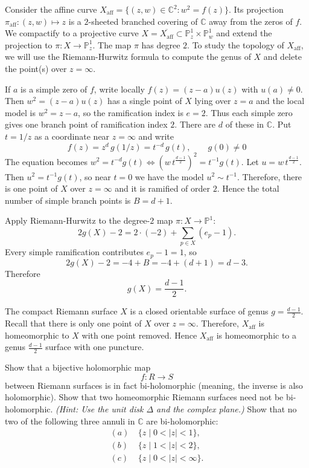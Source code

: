 \documentclass[12pt]{article}  %
\begin{document}
\begin{solution}
    Consider the affine curve $X_{\mathrm{aff}} = \{(z,w)\in\mathbb{C}^2 : w^2 = f(z)\}$. Its projection $\pi_{\mathrm{aff}} : (z,w) \mapsto z$ is a $2$-sheeted branched covering of $\mathbb{C}$ away from the zeros of $f$. We compactify to a projective curve $X = \overline{X_{\mathrm{aff}}} \subset \mathbb{P}^1_z \times \mathbb{P}^1_w$ and extend the projection to $\pi : X \longrightarrow \mathbb{P}^1_z$. The map $\pi$ has degree $2$.
    To study the topology of $X_{\mathrm{aff}}$, we will use the Riemann-Hurwitz formula to compute the genus of $X$ and delete the point(s) over $z=\infty$.



    If $a$ is a simple zero of $f$, write locally $f(z) = (z-a)u(z)$ with $u(a)\neq 0$. Then $w^2 = (z-a)u(z)$ has a single point of $X$ lying over $z=a$ and the local model is $w^2 = z-a$, so the ramification index is $e=2$. Thus each simple zero gives one branch point of ramification index $2$. There are $d$ of these in $\mathbb{C}$. Put $t=1/z$ as a coordinate near $z=\infty$ and write
    \[f(z) = z^{d}\,g(1/z) = t^{-d}\,g(t), \qquad g(0)\neq 0\]
    The equation becomes
    $w^2 = t^{-d}g(t) \Longleftrightarrow (w\,t^{\frac{d-1}{2}})^2 = t^{-1}g(t)$.
    Let $u = w\,t^{\frac{d-1}{2}}$. Then $u^2 = t^{-1}g(t)$, so near $t=0$ we have the model $u^2 \sim t^{-1}$. Therefore, there is one point of $X$ over $z=\infty$ and it is ramified of order $2$. Hence the total number of simple branch points is $B = d+1$.

    Apply Riemann-Hurwitz to the degree-$2$ map $\pi : X \to \mathbb{P}^1$:
    \[
        2g(X)-2 = 2\cdot(-2) + \sum_{p\in X}(e_p-1).
    \]
    Every simple ramification contributes $e_p-1=1$, so
    \[
        2g(X)-2 = -4 + B = -4 + (d+1) = d-3.
    \]
    Therefore
    \[
        g(X) = \frac{d-1}{2}.
    \]

    The compact Riemann surface $X$ is a closed orientable surface of genus $g = \frac{d-1}{2}$. Recall that there is only one point of $X$ over $z=\infty$. Therefore, $X_{\mathrm{aff}}$ is homeomorphic to $X$ with one point removed. Hence $X_{\mathrm{aff}}$ is homeomorphic to a genus $\frac{d-1}{2}$ surface with one puncture.

\end{solution}

\begin{problem}{3}
Show that a bijective holomorphic map
\[
    f : R \to S
\]
between Riemann surfaces is in fact bi-holomorphic (meaning, the inverse is also holomorphic). Show that two homeomorphic Riemann surfaces need not be bi-holomorphic. \emph{(Hint: Use the unit disk $\Delta$ and the complex plane.)} Show that no two of the following three annuli in $\mathbb{C}$ are bi-holomorphic:
\begin{align*}
    (a)\  & \{z \mid 0 < |z| < 1\},      \\
    (b)\  & \{z \mid 1 < |z| < 2\},      \\
    (c)\  & \{z \mid 0 < |z| < \infty\}.
\end{align*}
\end{problem}
\end{document}

